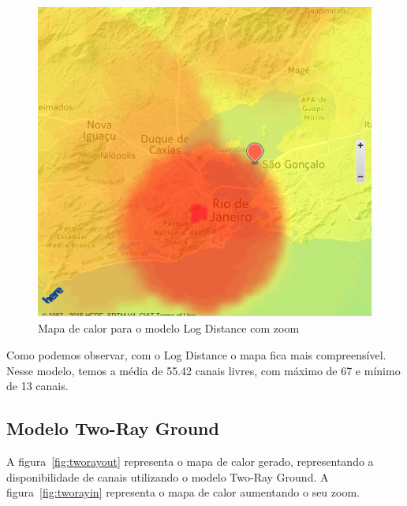 \begin{figure}[htb]
\centering
\includegraphics[width=1.0\textwidth]{figs/logdistancein}
\caption[Mapa de calor para o modelo Log Distance com zoom]
{Mapa de calor para o modelo Log Distance com zoom}
\label{fig:logdistancein}
\end{figure} 

\FloatBarrier

Como podemos observar, com o Log Distance o mapa fica mais compreensível. Nesse modelo, temos a média de 55.42 canais livres, com máximo de 67 e mínimo de 13 canais.

\subsection{Modelo Two-Ray Ground}

A figura~\ref{fig:tworayout} representa o mapa de calor gerado, representando a disponibilidade de canais utilizando o modelo Two-Ray Ground. A figura~\ref{fig:tworayin} representa o mapa de calor aumentando o seu zoom.

